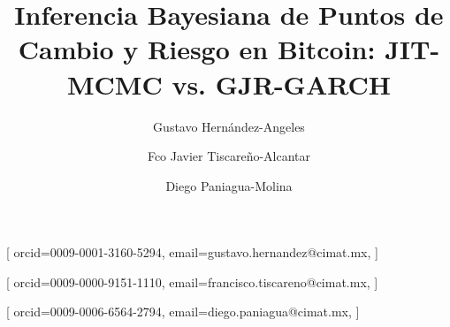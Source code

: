 \documentclass[
]{ceurart}
\begin{document}



\title{Inferencia Bayesiana de Puntos de Cambio y Riesgo en Bitcoin: JIT-MCMC vs. GJR-GARCH}



\author[1]{Gustavo Hernández-Angeles}[
orcid=0009-0001-3160-5294,
email=gustavo.hernandez@cimat.mx,
]\cormark[1] %

\author[1]{Fco Javier Tiscareño-Alcantar}[
orcid=0009-0000-9151-1110,
email=francisco.tiscareno@cimat.mx,
]

\author[1]{Diego Paniagua-Molina}[
orcid=0009-0006-6564-2794,
email=diego.paniagua@cimat.mx,
]


\address[1]{Mathematics Research Center (CIMAT—Centro de Investigación en Matemáticas), Graduate Program in Statistical Computing, Nuevo León, Mexico}





\end{document}
